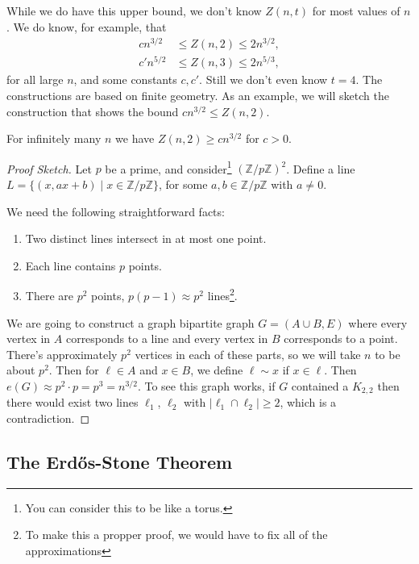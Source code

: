 \documentclass[a4paper]{scrartcl}
\begin{document}
While we do have this upper bound, we don't know $Z(n, t)$ for most values of $n$. We do know, for example, that
\begin{align*}
    cn^{3/2} &\leq Z(n, 2) \leq 2 n^{3/2}, \\
    c'n^{5/2} &\leq Z(n, 3) \leq 2 n^{5/3},
 \end{align*}
 for all large $n$, and some constants $c, c'$. Still we don't even know $t = 4$. The constructions are based on finite geometry. As an example, we will sketch the construction that shows the bound $cn^{3/2} \leq Z(n, 2)$.

\begin{theorem}
	For infinitely many $n$ we have $Z(n, 2) \geq cn^{3/2}$ for $c > 0$.
\end{theorem}
\begin{proof}[Proof Sketch]
	Let $p$ be a prime, and consider\footnote{You can consider this to be like a torus.} $(\mathbb{Z}/p\mathbb{Z})^2$. Define a line $L = \{(x, ax + b) \mid x \in \mathbb{Z}/p\mathbb{Z}\}$, for some $a, b \in \mathbb{Z}/p\mathbb{Z}$ with $a \neq 0$.

	We need the following straightforward facts:
	\begin{enumerate}
		\item Two distinct lines intersect in at most one point.
		\item Each line contains $p$ points.
		\item There are $p^2$ points, $p(p - 1) \approx p^2$ lines\footnote{To make this a propper proof, we would have to fix all of the approximations}.
	\end{enumerate}

	We are going to construct a graph bipartite graph $G = (A \cup B, E)$ where every vertex in $A$ corresponds to a line and every vertex in $B$ corresponds to a point. There's approximately $p^2$ vertices in each of these parts, so we will take $n$ to be about $p^2$. Then for $\ell \in A$ and $x \in B$, we define $\ell \sim x$ if $x \in \ell$. Then $e(G) \approx p^2 \cdot p = p^3 = n^{3/2}$.
	To see this graph works, if $G$ contained a $K_{2,2}$ then there would exist two lines $\ell_1$, $\ell_2$ with $|\ell_1 \cap \ell_2| \geq 2$, which is a contradiction. 
\end{proof}

\subsection{The Erdős-Stone Theorem}
\end{document}
